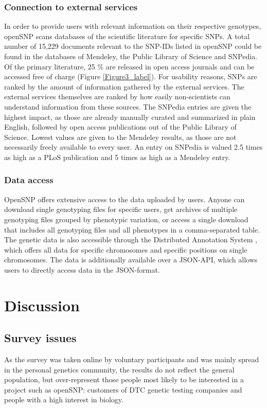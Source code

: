 \documentclass[10pt]{article}
\begin{document}
\subsubsection*{Connection to external services}
In order to provide users with relevant information on their respective genotypes, openSNP scans databases of the scientific literature for specific SNPs. 
A total number of 15,229 documents relevant to the SNP-IDs listed in openSNP could be found in the databases of Mendeley, the Public Library of Science and SNPedia. 
Of the primary literature, 25 \% are released in open access journals and can be accessed free of charge (Figure \ref{Figure3_label}). For usability reasons, 
SNPs are ranked by the amount of information gathered by the external services. The external services themselves are ranked by how easily non-scientists can understand information 
from these sources. The SNPedia entries are given the highest impact, as those are already manually curated and summarized in plain English, followed by open access publications out of 
the Public Library of Science. Lowest values are given to the Mendeley results, as those are not necessarily freely available to every user. 
An entry on SNPedia is valued 2.5 times as high as a PLoS publication and 5 times as high as a Mendeley entry.  

\subsubsection*{Data access}
OpenSNP offers extensive access to the data uploaded by users. Anyone can download single genotyping files for specific users, get archives of multiple genotyping files 
grouped by phenotypic variation, or access a single download that includes all genotyping files and all phenotypes in a comma-separated table. The genetic data is also 
accessible through the Distributed Annotation System \cite{Dowell2001,Jenkinson2008}, which offers all data for specific chromosomes and specific positions on single chromosomes. 
The data is additionally available over a JSON-API, which allows users to directly access data in the JSON-format.

\section*{Discussion}

\subsection*{Survey issues}
As the survey was taken online by voluntary participants and was mainly spread in the personal genetics community, 
the results do not reflect the general population, but over-represent those people most likely to be interested in
a project such as openSNP: customers of DTC genetic testing companies and people with a high interest in biology. 
\end{document}
